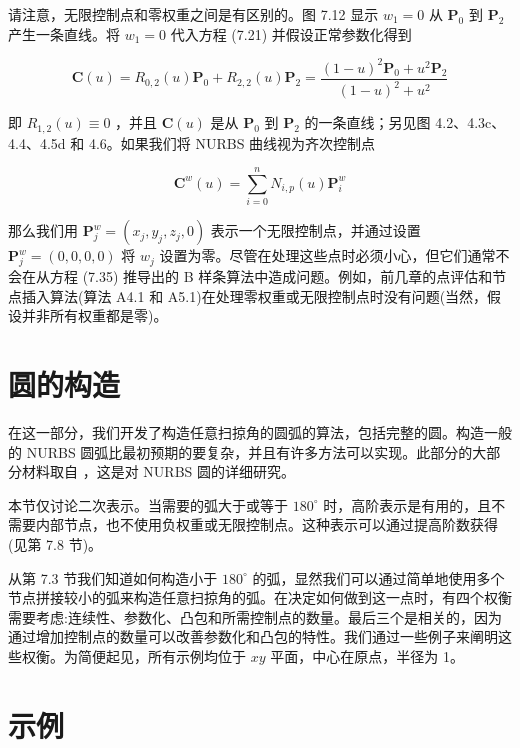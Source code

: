 \documentclass[../main.tex]{subfiles}
\begin{document}
请注意，无限控制点和零权重之间是有区别的。图 7.12 显示 \({w}_{1} = 0\) 从 \({\mathbf{P}}_{0}\) 到 \({\mathbf{P}}_{2}\) 产生一条直线。将 \({w}_{1} = 0\) 代入方程 (7.21) 并假设正常参数化得到

\[
\mathbf{C}\left( u\right)  = {R}_{0,2}\left( u\right) {\mathbf{P}}_{0} + {R}_{2,2}\left( u\right) {\mathbf{P}}_{2} = \frac{{\left( 1 - u\right) }^{2}{\mathbf{P}}_{0} + {u}^{2}{\mathbf{P}}_{2}}{{\left( 1 - u\right) }^{2} + {u}^{2}}
\]

即 \({R}_{1,2}\left( u\right)  \equiv  0\) ，并且 \(\mathbf{C}\left( u\right)\) 是从 \({\mathbf{P}}_{0}\) 到 \({\mathbf{P}}_{2}\) 的一条直线；另见图 4.2、4.3c、4.4、4.5d 和 4.6。如果我们将 NURBS 曲线视为齐次控制点

\[
{\mathbf{C}}^{w}\left( u\right)  = \mathop{\sum }\limits_{{i = 0}}^{n}{N}_{i,p}\left( u\right) {\mathbf{P}}_{i}^{w} \tag{7.35}
\]

那么我们用 \({\mathbf{P}}_{j}^{w} = \left( {{x}_{j},{y}_{j},{z}_{j},0}\right)\) 表示一个无限控制点，并通过设置 \({\mathbf{P}}_{j}^{w} = \left( {0,0,0,0}\right)\) 将 \({w}_{j}\) 设置为零。尽管在处理这些点时必须小心，但它们通常不会在从方程 (7.35) 推导出的 B 样条算法中造成问题。例如，前几章的点评估和节点插入算法(算法 A4.1 和 A5.1)在处理零权重或无限控制点时没有问题(当然，假设并非所有权重都是零)。



\section{圆的构造}

在这一部分，我们开发了构造任意扫掠角的圆弧的算法，包括完整的圆。构造一般的 NURBS 圆弧比最初预期的要复杂，并且有许多方法可以实现。此部分的大部分材料取自 \cite{Pieg89b}，这是对 NURBS 圆的详细研究。

本节仅讨论二次表示。当需要的弧大于或等于 \({180}^{ \circ  }\) 时，高阶表示是有用的，且不需要内部节点，也不使用负权重或无限控制点。这种表示可以通过提高阶数获得(见第 7.8 节)。

从第 7.3 节我们知道如何构造小于 \({180}^{ \circ  }\) 的弧，显然我们可以通过简单地使用多个节点拼接较小的弧来构造任意扫掠角的弧。在决定如何做到这一点时，有四个权衡需要考虑:连续性、参数化、凸包和所需控制点的数量。最后三个是相关的，因为通过增加控制点的数量可以改善参数化和凸包的特性。我们通过一些例子来阐明这些权衡。为简便起见，所有示例均位于 \({xy}\) 平面，中心在原点，半径为 1。

\section*{示例}
\end{document}
